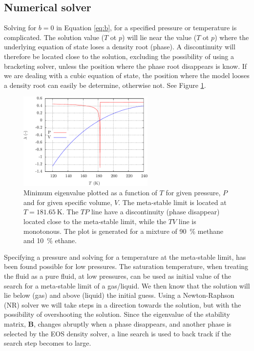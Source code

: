 \documentclass[english]{../thermomemo/thermomemo}
\newcommand*{\vektor}[1]{\boldsymbol{#1}}%
\begin{document}
\subsection{Numerical solver}
Solving for $b = 0$ in Equation \ref{eq:b}, for a specified pressure
or temperature is complicated. The solution value ($T$ ot $p$) will
lie near the value ($T$ ot $p$) where the underlying equation of state
loses a density root (phase). A discontinuity will therefore be
located close to the solution, excluding the possibility of using a
bracketing solver, unless the position where the phase root disappears
is know. If we are dealing with a cubic equation of state, the
position where the model looses a density root can easily be
determine, otherwise not. See Figure \ref{fig:meta_init}.
\begin{figure}[h]
  \centering
  \includegraphics[width=0.6\textwidth]{meta_init}
  \caption{Minimum eigenvalue plotted as a function of $T$ for given
    pressure, $P$ and for given specific volume, $V$. The
    meta-stable limit is located at $T=\SI{181.65}{\kelvin}$. The $TP$
    line have a discontinuity (phase disappear) located close to the
    meta-stable limit, while the $TV$ line is monotonous. The plot is
    generated for a mixture of \SI{90}{\percent} methane and
    \SI{10}{\percent} ethane.}
  \label{fig:meta_init}
\end{figure}

Specifying a pressure and solving for a temperature at the meta-stable
limit, has been found possible for low pressures. The saturation
temperature, when treating the fluid as a pure fluid, at low
pressures, can be used as initial value of the search for a
meta-stable limit of a gas/liquid. We then know that the solution will
lie below (gas) and above (liquid) the initial guess. Using a
Newton-Raphson (NR) solver we will take steps in a direction towards
the solution, but with the possibility of overshooting the
solution. Since the eigenvalue of the stability matrix, $\vektor{B}$,
changes abruptly when a phase disappears, and another phase is selected
by the EOS density solver, a line search is used to back track if the
search step becomes to large.
\end{document}
